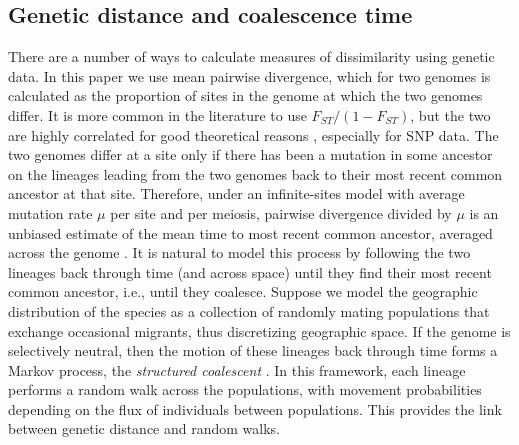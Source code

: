 \documentclass{article}
\begin{document}
\subsection*{Genetic distance and coalescence time}

There are a number of ways to calculate measures of dissimilarity using genetic data.
In this paper we use mean pairwise divergence, 
which for two genomes is calculated as the proportion of sites in the genome
at which the two genomes differ. 
It is more common in the literature to use $F_{ST}/(1-F_{ST})$, 
but the two are highly correlated for good theoretical reasons 
\citep{slatkin1991inbreeding,rousset1997genetic},
especially for SNP data.
The two genomes differ at a site only if there has been a mutation in some ancestor on the lineages leading
from the two genomes back to their most recent common ancestor at that site.
Therefore,
under an infinite-sites model with average mutation rate $\mu$ per site and per meiosis,
pairwise divergence divided by $\mu$
is an unbiased estimate of the mean time to most recent common ancestor,
averaged across the genome \citep{hudson2007variance,ralph2015empirical}.
It is natural to model this process by following the two lineages back through time
(and across space)
until they find their most recent common ancestor,
i.e., until they coalesce.
Suppose we model the geographic distribution of the species
as a collection of randomly mating populations
that exchange occasional migrants,
thus discretizing geographic space.
If the genome is selectively neutral,
then the motion of these lineages back through time
forms a Markov process, the \emph{structured coalescent} \citep{wakeley2005coalescent}.
In this framework, each lineage performs a random walk across the populations,
with movement probabilities depending on the flux of individuals between populations.
This provides the link between genetic distance and random walks.
\end{document}
